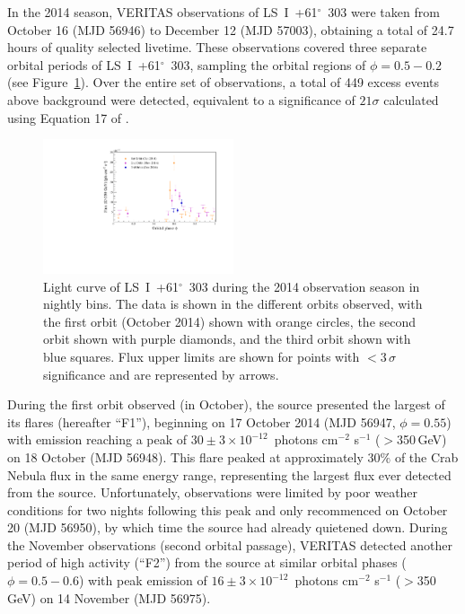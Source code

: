 \documentclass[preprint2]{aastex}
\newcommand{\pflux}{~photons cm$^{-2}$ s$^{-1}$}
\newcommand{\lsi}{LS~I~+61$^{\circ}$~303}
\newcommand{\gev}{\,GeV}
\begin{document}
In the 2014 season, VERITAS observations of \lsi{} were taken from October 16 (MJD 56946) to  December 12 (MJD 57003), obtaining a total of 24.7 hours of quality selected livetime. These observations covered three separate orbital periods of \lsi{}, sampling the orbital regions of $\phi = 0.5-0.2$ (see Figure~\ref{f:fig1}). Over the entire set of observations, a total of 449 excess events above background were detected, equivalent to a significance of $21\sigma$ calculated using Equation 17 of \citet{LiMa}.

\begin{figure}[ht]
\centering
\includegraphics[width=0.5\textwidth]{./figs/fluxvphase.pdf}
\caption{Light curve of \lsi{} during the 2014 observation season in nightly bins. %
The data is shown in the different orbits observed, with the first orbit (October 2014) shown with orange circles, the second orbit shown with purple diamonds, and the third orbit shown with blue squares. Flux upper limits are shown for points with $<3\,\sigma$ significance and are represented by arrows.
}
\label{f:fig1}
\end{figure}

During the first orbit observed (in October), the source presented the largest of its flares (hereafter ``F1''), beginning on 17 October 2014 (MJD 56947, $\phi = 0.55$) with emission reaching a peak of $30 \pm 3 \times10^{-12}$\pflux{} ($>$350\gev{}) on 18 October (MJD 56948). This flare peaked at approximately $30\%$ of the Crab Nebula flux in the same energy range, representing the largest flux ever detected from the source. Unfortunately, observations were limited by poor weather conditions for two nights following this peak and only recommenced on October 20 (MJD 56950), by which time the source had already quietened down. During the November observations (second orbital passage), VERITAS detected another period of high activity (``F2'') from the source at similar orbital phases ($\phi = 0.5-0.6$) with peak emission of $16 \pm 3 \times10^{-12}$\pflux{} ($>$350\gev{}) on 14 November (MJD 56975).
\end{document}
